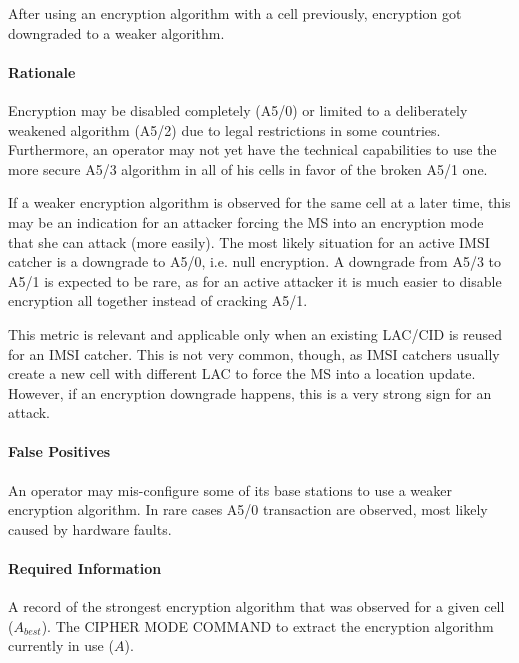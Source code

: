 \documentclass[a4paper,11pt,notitlepage,bigheadings,oneside]{scrartcl}
\begin{document}
After using an encryption algorithm with a cell previously, encryption got
downgraded to a weaker algorithm.

\paragraph{Rationale}

Encryption may be disabled completely (A5/0) or limited to a deliberately
weakened algorithm (A5/2) due to legal restrictions in some countries.
Furthermore, an operator may not yet have the technical capabilities to use the
more secure A5/3 algorithm in all of his cells in favor of the broken A5/1 one.

If a weaker encryption algorithm is observed for the same cell at a later time,
this may be an indication for an attacker forcing the MS into an encryption
mode that she can attack (more easily). The most likely situation for an active
IMSI catcher is a downgrade to A5/0, i.e. null encryption. A downgrade from
A5/3 to A5/1 is expected to be rare, as for an active attacker it is much
easier to disable encryption all together instead of cracking A5/1.

This metric is relevant and applicable only when an existing LAC/CID is reused
for an IMSI catcher. This is not very common, though, as IMSI catchers usually
create a new cell with different LAC to force the MS into a location update.
However, if an encryption downgrade happens, this is a very strong sign for an
attack.

\paragraph{False Positives}

An operator may mis-configure some of its base stations to use a weaker
encryption algorithm. In rare cases A5/0 transaction are observed, most likely
caused by hardware faults.


\paragraph{Required Information}

A record of the strongest encryption algorithm that was observed for a given
cell ($A_{best}$). The CIPHER MODE COMMAND to extract the encryption algorithm
currently in use ($A$).
\end{document}
